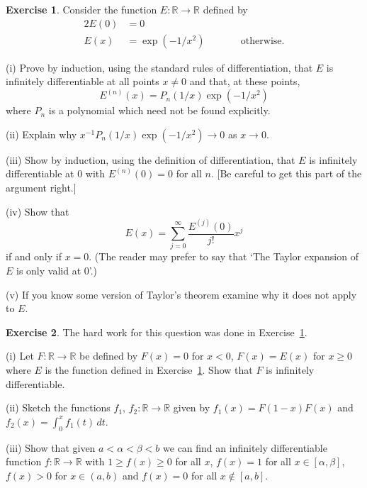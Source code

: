 \documentclass[12pt]{article}
\theoremstyle{definition}
\newtheorem{question}{Exercise}[section]
\begin{document}
\begin{question}\label{start bump} Consider the function
$E:{\mathbb R}\rightarrow{\mathbb R}$ defined by
\begin{alignat*}{2}
E(0)&=0\\
E(x)&=\exp(-1/x^{2})&&\qquad\text{otherwise}.
\end{alignat*}

(i) Prove by induction, using the standard rules of differentiation,
that $E$ is infinitely differentiable at all points $x\neq 0$
and that, at these points,
\[E^{(n)}(x)=P_{n}(1/x)\exp(-1/x^{2})\]
where $P_{n}$ is a polynomial which need not be found explicitly.

(ii) Explain why $x^{-1}P_{n}(1/x)\exp(-1/x^{2})\rightarrow 0$
as $x\rightarrow 0$.

(iii) Show by induction, using the definition of differentiation,
that $E$ is infinitely differentiable at $0$
with $E^{(n)}(0)=0$ for all $n$.
[Be careful to get this part of the argument
right.]

(iv) Show that
\[E(x)=\sum_{j=0}^{\infty}\frac{E^{(j)}(0)}{j!}x^{j}\]
if and only if $x=0$. (The reader may prefer to say
that `The Taylor expansion of $E$ is only valid at $0$'.)

(v) If you know some version of Taylor's theorem examine
why it does not apply to $E$.
\end{question}
\begin{question}\label{end bump}
The hard work for this question was done in 
Exercise~\ref{start bump}.

(i) Let $F:{\mathbb R}\rightarrow{\mathbb R}$ be defined by
$F(x)=0$ for $x<0$, $F(x)=E(x)$ for $x\geq 0$ where
$E$ is the function defined in Exercise~\ref{start bump}.
Show that $F$ is infinitely differentiable.

(ii) Sketch the functions $f_{1},\,f_{2}:{\mathbb R}\rightarrow{\mathbb R}$
given by $f_{1}(x)=F(1-x)F(x)$ and $f_{2}(x)=\int_{0}^{x}f_{1}(t)\,dt$.

(iii) Show that given $a<\alpha<\beta<b$ we can find an
infinitely differentiable function $f:{\mathbb R}\rightarrow{\mathbb R}$
with $1\geq f(x)\geq 0$ for all $x$, $f(x)=1$ for all $x\in[\alpha,\beta]$,
$f(x)>0$ for $x\in(a,b)$
and $f(x)=0$ for all $x\notin [a,b]$.
\end{question}
\end{document}
